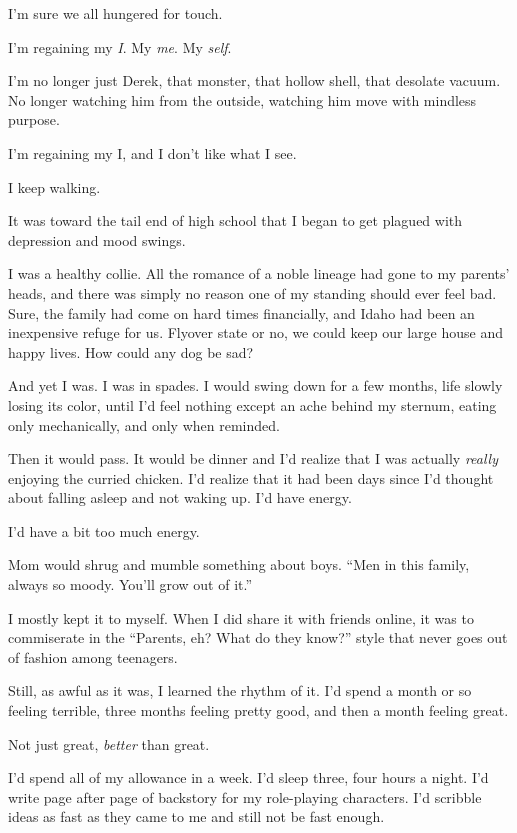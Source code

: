 I'm sure we all hungered for touch.

\secdiv{}

\noindent I'm regaining my \emph{I}. My \emph{me}. My \emph{self}.

I'm no longer just Derek, that monster, that hollow shell, that desolate vacuum. No longer watching him from the outside, watching him move with mindless purpose.

I'm regaining my I, and I don't like what I see.

I keep walking.

\secdiv{}

\noindent It was toward the tail end of high school that I began to get plagued with depression and mood swings.

I was a healthy collie. All the romance of a noble lineage had gone to my parents' heads, and there was simply no reason one of my standing should ever feel bad. Sure, the family had come on hard times financially, and Idaho had been an inexpensive refuge for us. Flyover state or no, we could keep our large house and happy lives. How could any dog be sad?

And yet I was. I was in spades. I would swing down for a few months, life slowly losing its color, until I'd feel nothing except an ache behind my sternum, eating only mechanically, and only when reminded.

Then it would pass. It would be dinner and I'd realize that I was actually \emph{really} enjoying the curried chicken. I'd realize that it had been days since I'd thought about falling asleep and not waking up. I'd have energy.

I'd have a bit too much energy.

Mom would shrug and mumble something about boys. ``Men in this family, always so moody. You'll grow out of it.''

I mostly kept it to myself. When I did share it with friends online, it was to commiserate in the ``Parents, eh? What do they know?'' style that never goes out of fashion among teenagers.

Still, as awful as it was, I learned the rhythm of it. I'd spend a month or so feeling terrible, three months feeling pretty good, and then a month feeling great.

Not just great, \emph{better} than great.

I'd spend all of my allowance in a week. I'd sleep three, four hours a night. I'd write page after page of backstory for my role-playing characters. I'd scribble ideas as fast as they came to me and still not be fast enough.


